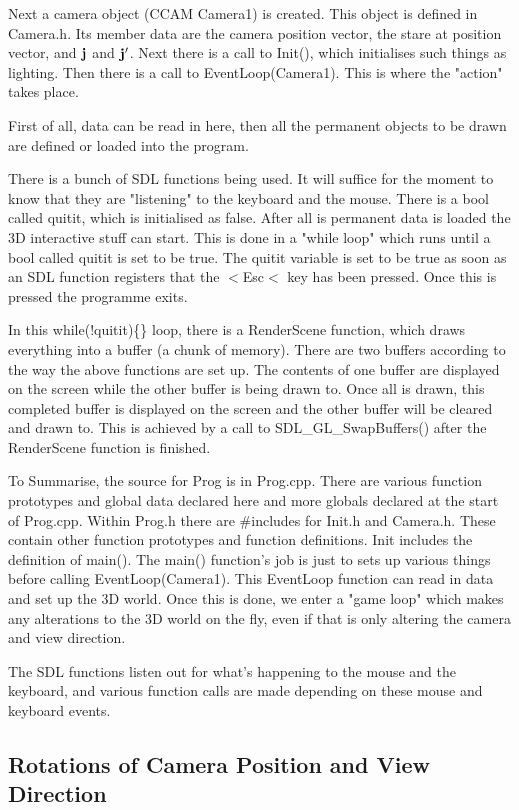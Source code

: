 \documentclass[12pt]{article}
\begin{document}
Next a camera object (CCAM Camera1) is created. 
This object is defined in Camera.h.
Its member data are the camera position vector, the stare
at position vector, and ${\bf j}$ and ${\bf j}^\prime$.
Next there is a call to Init(), which
initialises such things as lighting. Then there is a call
to EventLoop(Camera1). This is where the "action" takes place.


First of all, data can be read in here, then all the 
permanent objects to be drawn
are defined or loaded into the program.

There is a bunch of SDL functions being used. It will suffice
for the moment to know that they are "listening" to the
keyboard and the mouse. There is a bool called quitit, which is
initialised as false. After all is permanent data is loaded
the 3D interactive stuff can start. This is done in
a "while loop"  which runs until a bool called quitit 
is set to be true.
The quitit variable is set to be true as soon as an SDL function registers
that the $<$Esc$<$ key has been pressed. Once this is pressed
the programme exits. 

In this while(!quitit)\{\} loop, there is a RenderScene function, which 
draws everything into a buffer (a chunk of memory). There are two
buffers according to the way the above functions are set up.
The contents of one buffer are displayed on the screen while the other buffer
is being drawn to. Once all is drawn, this completed buffer
is displayed on the screen and the other buffer will be cleared
and  drawn to.
This is achieved by a call to SDL\_GL\_SwapBuffers() after the RenderScene
function is finished.

To Summarise, the source for Prog is in Prog.cpp.
There are various function prototypes and global data declared here
and more globals declared at the start of Prog.cpp.
Within Prog.h there are \#includes for Init.h and
Camera.h. These contain other function prototypes
and function definitions. Init includes the
definition of main(). The main() function's  job is just to
sets up various things before calling
 EventLoop(Camera1). This EventLoop function can read in
data and set up the 3D world. Once this is done, we enter
a "game loop" which makes any alterations to the
3D world on the fly, even if that is only altering the
camera and view direction.

The SDL functions listen out for what's happening to the mouse
and the keyboard, and various function calls are made
depending on these mouse and keyboard events.

\subsection{Rotations of Camera Position and View Direction}
\end{document}
